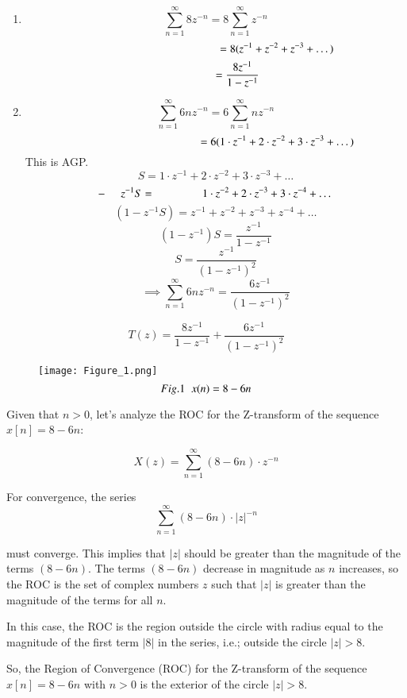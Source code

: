 \documentclass[journal,12pt,twocolumn]{IEEEtran}
\theoremstyle{remark}
\begin{document}
\begin{enumerate}
    \item \[\sum_{n=1}^{\infty} 8z^{-n}=8\sum_{n=1}^{\infty} z^{-n}\]
    \[\hspace{3.9cm}=8(z^{-1}+z^{-2}+z^{-3}+\dots)\]
    \[\hspace{1.4cm}=\frac{8z^{-1}}{1-z^{-1}}\]

    \item \[\sum_{n=1}^{\infty} 6nz^{-n}=6\sum_{n=1}^{\infty}nz^{-n}\]
    \[\hspace{3.9cm}=6(1\cdot z^{-1} + 2\cdot z^{-2} + 3\cdot z^{-3} + \dots)\]
    This is AGP.
    \[S=1\cdot z^{-1}+2\cdot z^{-2}+3\cdot z^{-3}+\dots\]
    \[-\hspace{0.5cm}z^{-1}S=\hspace{1.5cm}1\cdot z^{-2}+2\cdot z^{-3}+3\cdot z^{-4}+\dots\]
    \hrulefill
    \[(1-z^{-1}S)=z^{-1}+z^{-2}+z^{-3}+z^{-4}+\dots\]
    \[(1-z^{-1})S=\frac{z^{-1}}{1-z^{-1}}\]
    \[S=\frac{z^{-1}}{(1-z^{-1})^{2}}\]
    \[\implies \sum_{n=1}^{\infty}6nz^{-n}=\frac{6z^{-1}}{(1-z^{-1})^{2}}\]
\end{enumerate}
\vspace{1cm}
\[T(z)=\frac{8z^{-1}}{1-z^{-1}}+\frac{6z^{-1}}{(1-z^{-1})^{2}}\]

\newpage

\begin{figure}
    \centering
    \texttt{[image: Figure\_1.png]}
    \[Fig. 1\hspace{2mm}x(n) = 8 - 6n\]
\end{figure}

Given that \( n > 0 \), let's analyze the ROC for the Z-transform of the sequence \( x[n] = 8 - 6n \):

\[X(z) = \sum_{n=1}^{\infty} (8 - 6n) \cdot z^{-n}\]

For convergence, the series 
\vspace{2mm}
\[\sum_{n=1}^{\infty} (8 - 6n) \cdot |z|^{-n}\]

\vspace{2mm}
must converge. This implies that \( |z| \) should be greater than the magnitude of the terms \( (8 - 6n) \). The terms \( (8 - 6n) \) decrease in magnitude as \( n \) increases, so the ROC is the set of complex numbers \( z \) such that \( |z| \) is greater than the magnitude of the terms for all \( n \).
\vspace{2mm}

In this case, the ROC is the region outside the circle with radius equal to the magnitude of the first term \( |8| \) in the series, i.e.; outside the circle \( |z| > 8 \).
\vspace{2mm}

So, the Region of Convergence (ROC) for the Z-transform of the sequence \( x[n] = 8 - 6n \) with \( n > 0 \) is the exterior of the circle \( |z| > 8 \).
\end{document}
